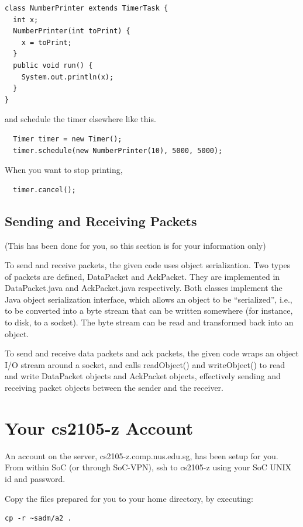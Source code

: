 \documentclass[a4paper,11pt]{exam}
\begin{document}
\begin{verbatim}
class NumberPrinter extends TimerTask {
  int x;
  NumberPrinter(int toPrint) {
    x = toPrint;
  } 
  public void run() {
    System.out.println(x);
  }
}
\end{verbatim}
and schedule the timer elsewhere like this.
\begin{verbatim}
  Timer timer = new Timer();
  timer.schedule(new NumberPrinter(10), 5000, 5000);
\end{verbatim}
When you want to stop printing,
\begin{verbatim}
  timer.cancel();
\end{verbatim}

\subsection*{Sending and Receiving Packets}

(This has been done for you, so this section is for your information only)

To send and receive packets, the given code uses object serialization.  Two types of packets are defined, DataPacket and AckPacket.  They are implemented in DataPacket.java and AckPacket.java respectively.  Both classes implement the Java object serialization interface, which allows an object to be ``serialized'', i.e., to be converted into a byte stream that can be written somewhere (for instance, to disk, to a socket).  The byte stream can be read and transformed back into an object.

To send and receive data packets and ack packets, the given code wraps an object I/O stream around a socket, and calls readObject() and writeObject() to read and write DataPacket objects and AckPacket objects, effectively sending and receiving packet objects between the sender and the receiver.

\section*{Your cs2105-z Account}

An account on the server, cs2105-z.comp.nus.edu.sg, has been setup for you. From within SoC (or through SoC-VPN), ssh to cs2105-z using your SoC UNIX id and password.

Copy the files prepared for you to your home directory, by executing:

\begin{verbatim}
cp -r ~sadm/a2 .
\end{verbatim}
\end{document}
